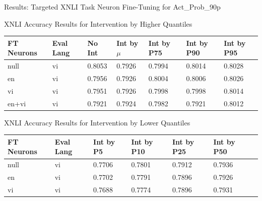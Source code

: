 \documentclass[aspectratio=169]{beamer}
\begin{document}
\begin{frame}{Results: Targeted XNLI Task Neuron Fine-Tuning for Act\_Prob\_90p}
	\begin{block}{\scriptsize XNLI Accuracy Results for Intervention by Higher Quantiles}\scriptsize
	\begin{table}[ht]
		\centering
		\renewcommand{\arraystretch}{1.3}
		\setlength{\tabcolsep}{4pt}
		\begin{tabularx}{\textwidth}{|X|X|X|X|X|X|X|}
			\hline
			\textbf{FT Neurons} & \textbf{Eval Lang} & \textbf{No Int} & \textbf{Int by $\mu$} & \textbf{Int by P75} & \textbf{Int by P90} & \textbf{Int by P95} \\
			\hline
			null & vi & 0.8053 & 0.7926 & 0.7994 & 0.8014 & 0.8028 \\
			en & vi & 0.7956 & 0.7926 & 0.8004 & 0.8006 & 0.8026 \\
			vi & vi & 0.7951 & 0.7926 & 0.7998 & 0.7998 & 0.8014 \\
			en+vi & vi & 0.7921 & 0.7924 & 0.7982 & 0.7921 & 0.8012 \\
			\hline
		\end{tabularx}
	\end{table}
	\end{block}
	\begin{block}{\scriptsize XNLI Accuracy Results for Intervention by Lower Quantiles}\scriptsize
		
		\begin{table}[ht]
			\centering
			\renewcommand{\arraystretch}{1.3}
			\setlength{\tabcolsep}{4pt}
			\begin{tabularx}{\textwidth}{|X|X|X|X|X|X|X|}
				\hline
				\textbf{FT Neurons} & \textbf{Eval Lang} & \textbf{Int by P5} & \textbf{Int by P10} & \textbf{Int by P25} & \textbf{Int by P50} \\
				\hline
				null & vi & 0.7706 & 0.7801 & 0.7912 & 0.7936 \\
				en & vi & 0.7702 & 0.7791 & 0.7896 & 0.7926 \\
				vi & vi & 0.7688 & 0.7774 & 0.7896 & 0.7931 \\
				\hline
			\end{tabularx}
		\end{table}
	\end{block}
\end{frame}	
\end{document}
